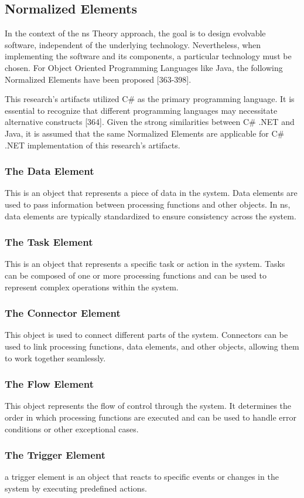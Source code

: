 \subsection{Normalized Elements} \label{subsec_ns_elements} 

In the context of the \gls{ns} Theory approach, the goal is to design evolvable software,
independent of the underlying technology. Nevertheless, when implementing the software and
its components, a particular technology must be chosen. For Object Oriented Programming
Languages like Java, the following Normalized Elements have been proposed
\parencite{mannaert_normalized_2016}[363-398].

This research's artifacts utilized C\# as the primary programming language. It is essential
to recognize that different programming languages may necessitate alternative constructs
\parencite{mannaert_normalized_2016}[364]. Given the strong similarities between C\# .NET
and Java, it is assumed that the same Normalized Elements are applicable for C\# .NET
implementation of this research's artifacts.

\subsubsection{The Data Element}
This is an object that represents a piece of data in the system. Data elements are used to
pass information between processing functions and other objects. In \gls{ns},
data elements are typically standardized to ensure consistency across the system.

\subsubsection{The Task Element}
This is an object that represents a specific task or action in the system. Tasks can be
composed of one or more processing functions and can be used to represent complex
operations within the system.

\subsubsection{The Connector Element}
This object is used to connect different parts of the system. Connectors can be
used to link processing functions, data elements, and other objects, allowing them to work
together seamlessly.

\subsubsection{The Flow Element}
This object represents the flow of control through the system. It determines the order in
which processing functions are executed and can be used to handle error conditions or
other exceptional cases.

\subsubsection{The Trigger Element}
a trigger element is an object that reacts to specific events or changes in the system
by executing predefined actions.